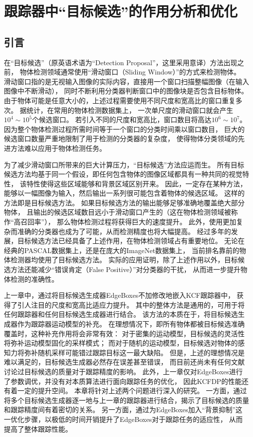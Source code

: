 \chapter{跟踪器中``目标候选''的作用分析和优化}
\label{chapijcv}

\section{引言}
在``目标候选''（原英语术语为``Detection Proposal''，这里采用意译）方法出现之前，
物体检测领域通常使用``滑动窗口（Sliding Window）''的方式来检测物体。
滑动窗口指的是无视输入图像的实际内容，直接用一个窗口扫描整幅图像（在输入图像中不断滑动），
同时不断利用分类器判断窗口中的图像块是否包含目标物体。
由于物体可能是任意大小的，上述过程需要使用不同尺度和宽高比的窗口重复多次。
据统计，在常用的物体检测数据集上，
一次单尺度的滑动窗口就会产生$10^4\sim 10^5$个候选窗口。
若引入不同的尺度和宽高比，窗口数目将高达$10^6\sim 10^7$。
因为整个物体检测过程所需时间等于一个窗口的分类时间乘以窗口数目，
巨大的候选窗口数量严重地限制了用于检测的分类器的复杂度，
使得物体分类领域的先进方法难以应用于物体检测任务。

为了减少滑动窗口所带来的巨大计算压力，``目标候选''方法应运而生。
所有目标候选方法均基于同一个假设，即任何包含物体的图像区域都具有一种共同的视觉特性，
该特性使得这些区域能够和背景区域区别开来。
因此，一定存在某种方法，能够以一幅图像为输入，然后输出一系列很可能包含着物体的候选区域。
这样的方法即是目标候选方法。
如果目标候选方法的输出能够足够准确地覆盖绝大部分物体，
且输出的候选区域数目远小于滑动窗口产生的（这在物体检测领域被称作``高召回率''），
那么物体检测过程将获得巨大的速度提升。
此外，使用更加复杂而准确的分类器也成为了可能，从而检测精度也将大幅提高。
经过多年的发展，目标候选方法已经具备了上述作用，在物体检测领域占有重要地位。
无论在经典的PASCAL数据集上，还是在庞大的ImageNet数据集上，
当前排名靠前的物体检测器均使用了目标候选方法。
实际的应用证明，除了上述作用以外，目标候选方法还能减少``错误肯定（False Positive）''对分类器的干扰，
从而进一步提升物体检测的准确性。

上一章中，通过将目标候选生成器EdgeBoxes不加修改地嵌入KCF跟踪器中，
获得了引人注目的尺度和宽高比适应力提升。
其中的整体方法是通用的，可用于将任何跟踪器和任何目标候选生成器进行结合。
该方法的本质在于，将目标候选生成器作为跟踪器运动模型的补充。
在理想情况下，即所有物体都被目标候选准确覆盖时，这种补充作用将会非常有效：
对于密集的运动模型，目标候选的灵活性将弥补运动模型固化的采样模式；
而对于随机的运动模型，目标候选对物体的感知力将弥补随机采样可能错过跟踪目标这一最大缺陷。
但是，上述的理想情况是难以满足的，目标候选生成器必然存在误差甚至错误，
而目前还尚未有任何文献讨论过目标候选的质量对于跟踪精度的影响。
此外，上一章仅对EdgeBoxes进行了参数调优，并没有对本质算法进行面向跟踪任务的优化，
因此KCFDP的性能还有着一定的提升空间。
本章将针对上述两个问题进行深入的研究。
一方面，通过将多个目标候选生成器逐一地与上一章的跟踪器进行结合，揭示了目标候选的质量和跟踪精度间有着密切的关系。
另一方面，通过为EdgeBoxes加入``背景抑制''这一优化步骤，以极低的时间开销提升了EdgeBoxes对于跟踪任务的适应性，
从而提高了整体跟踪性能。

